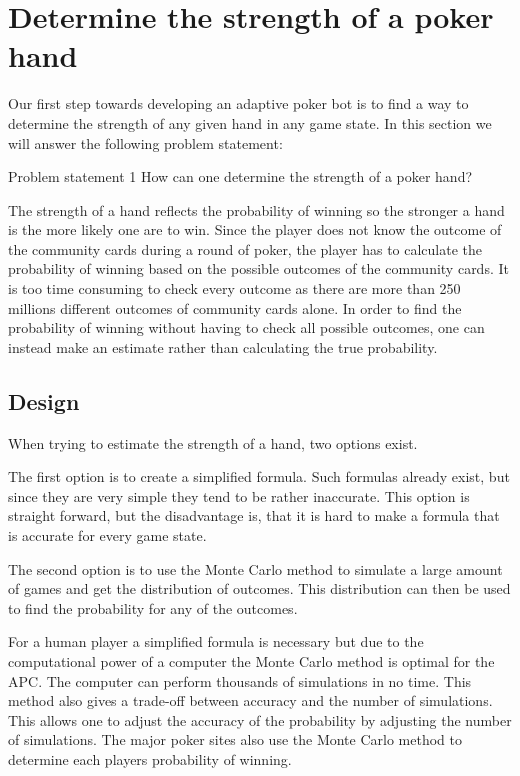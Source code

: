 \section{Determine the strength of a poker hand}
\label{sec:part1}
Our first step towards developing an adaptive poker bot is to find a way to determine the strength of any given hand in any game state. In this section we will answer the following problem statement: 

\vspace{4mm}
\begin{statementBox2}{Problem statement 1}
How can one determine the strength of a poker hand?
\end{statementBox2}
\vspace{4mm}

The strength of a hand reflects the probability of winning so the stronger a hand is the more likely one are to win. Since the player does not know the outcome of the community cards during a round of poker, the player has to calculate the probability of winning based on the possible outcomes of the community cards. It is too time consuming to check every outcome as there are more than 250 millions different outcomes of community cards alone. In order to find the probability of winning without having to check all possible outcomes, one can instead make an estimate rather than calculating the true probability. 

\subsection{Design}
When trying to estimate the strength of a hand, two options exist.

The first option is to create a simplified formula. Such formulas already exist, but since they are very simple they tend to be rather inaccurate. This option is straight forward, but the disadvantage is, that it is hard to make a formula that is accurate for every game state.

The second option is to use the Monte Carlo method to simulate a large amount of games and get the distribution of outcomes. This distribution can then be used to find the probability for any of the outcomes.

For a human player a simplified formula is necessary but due to the computational power of a computer the Monte Carlo method is optimal for the APC. The computer can perform thousands of simulations in no time. This method also gives a trade-off between accuracy and the number of simulations. This allows one to adjust the accuracy of the probability by adjusting the number of simulations. The major poker sites also use the Monte Carlo method to determine each players probability of winning.

